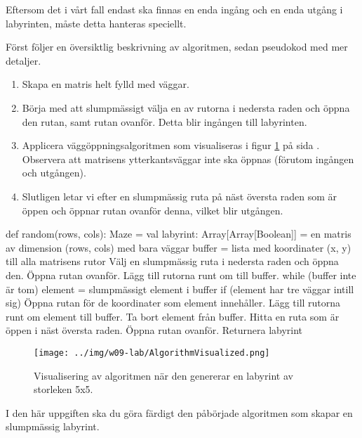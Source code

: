 Eftersom det i vårt fall endast ska finnas en enda ingång och en enda utgång i labyrinten, måste detta hanteras speciellt.

Först följer en översiktlig beskrivning av algoritmen, sedan pseudokod med mer detaljer.

\begin{enumerate}
    \item Skapa en matris helt fylld med väggar.
	\item Börja med att slumpmässigt välja en av rutorna i nedersta raden och öppna den rutan, samt rutan ovanför. Detta blir ingången till labyrinten.
	\item Applicera väggöppningsalgoritmen som visualiseras i figur \ref{lab:maze:prims-algo-viz} på sida \pageref{lab:maze:prims-algo-viz}. Observera att matrisens ytterkantsväggar inte ska öppnas (förutom ingången och utgången).
	\item Slutligen letar vi efter en slumpmässig ruta på näst översta raden som är öppen och öppnar rutan ovanför denna, vilket blir utgången.
\end{enumerate}

\begin{Code}
def random(rows, cols): Maze = {
  val labyrint: Array[Array[Boolean]] = 
    en matris av dimension (rows, cols) med bara väggar
  buffer = lista med koordinater (x, y) till alla matrisens rutor
  Välj en slumpmässig ruta i nedersta raden och öppna den.
  Öppna rutan ovanför.
  Lägg till rutorna runt om till buffer.
  while (buffer inte är tom){
    element = slumpmässigt element i buffer
    if (element har tre väggar intill sig)
        Öppna rutan för de koordinater som element innehåller.
        Lägg till rutorna runt om element till buffer.
    Ta bort element från buffer.
  }
  Hitta en ruta som är öppen i näst översta raden.
  Öppna rutan ovanför.
  Returnera labyrint 
}
\end{Code}


\begin{figure}[H]
	\begin{center}
		\texttt{[image: ../img/w09-lab/AlgorithmVisualized.png]}
	\end{center}
	\caption{Visualisering av algoritmen när den genererar en labyrint av storleken 5x5.}
	\label{lab:maze:prims-algo-viz}
\end{figure}


\Task I den här uppgiften ska du göra färdigt den påbörjade algoritmen som skapar en slumpmässig labyrint.

